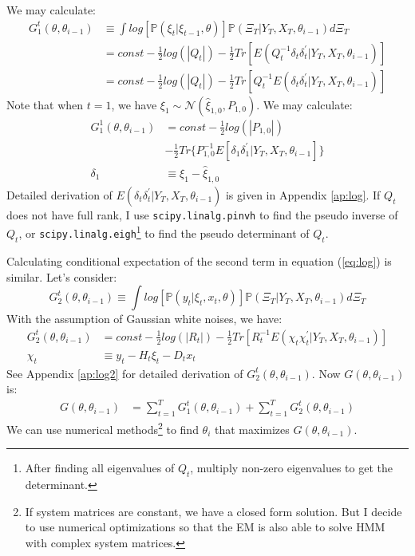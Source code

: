 \documentclass[12pt]{article}
\numberwithin{equation}{section}
\begin{document}
We may calculate:
\begin{align}
    G_1^{t}(\theta,\theta_{i-1}) &\equiv \int log[\mathbb{P}(\xi_t|\xi_{t-1},\theta)]\mathbb{P}(\Xi_T|Y_T,X_T,\theta_{i-1})d\Xi_T \nonumber \\
    &= const -\frac{1}{2}log(|Q_t|)-\frac{1}{2}Tr[E(Q_t^{-1}\delta_t\delta_t^{'}|Y_T,X_T,\theta_{i-1})] \nonumber \\
    &= const - \frac{1}{2}log(|Q_t|) - \frac{1}{2}Tr[Q_t^{-1}E(\delta_t\delta_t^{'}|Y_T,X_T,\theta_{i-1})] \label{eq:log1_trace}
\end{align}
Note that when $t=1$, we have $\xi_1\sim\mathcal{N}(\hat{\xi}_{1,0}, P_{1,0})$. We may calculate:
\begin{align}
    G_1^1(\theta,\theta_{i-1}) &= const - \frac{1}{2}log(|P_{1,0}|) \nonumber \\
    &- \frac{1}{2}Tr\{P_{1,0}^{-1}E[\delta_1\delta_1^{'}|Y_T, X_T, \theta_{i-1}]\} \nonumber \\
    \delta_1 &\equiv \xi_1 - \hat{\xi}_{1,0} \nonumber
\end{align}
Detailed derivation of $E(\delta_t\delta_t^{'}|Y_T,X_T,\theta_{i-1})$ is given in Appendix \ref{ap:log}. If $Q_t$ does not have full rank, I use \texttt{scipy.linalg.pinvh} to find the pseudo inverse of $Q_t$, or \texttt{scipy.linalg.eigh}\footnote{After finding all eigenvalues of $Q_t$, multiply non-zero eigenvalues to get the determinant.} to find the pseudo determinant of $Q_t$.

Calculating conditional expectation of the second term in equation (\ref{eq:log}) is similar. Let's consider:
\[
    G_2^t(\theta,\theta_{i-1}) \equiv \int log[\mathbb{P}(y_t|\xi_{t},x_t, \theta)]\mathbb{P}(\Xi_T|Y_T,X_T,\theta_{i-1})d\Xi_T 
\]
With the assumption of Gaussian white noises, we have:
\begin{align}
    G_2^t(\theta,\theta_{i-1}) &= const - \frac{1}{2}log(|R_t|)-\frac{1}{2}Tr[R_t^{-1}E(\chi_t\chi_t^{'}|Y_T,X_T,\theta_{i-1})] \label{eq:log2_trace} \\
    \chi_t &\equiv y_t - H_t\xi_t - D_tx_t \nonumber
\end{align}
See Appendix \ref{ap:log2} for detailed derivation of $G_2^t(\theta,\theta_{i-1})$. Now $G(\theta,\theta_{i-1})$ is:
\begin{align*}
    G(\theta,\theta_{i-1}) &= \sum_{t=1}^{T}G_1^t(\theta,\theta_{i-1}) + \sum_{t=1}^{T}G_2^t(\theta,\theta_{i-1})
\end{align*}
We can use numerical methods\footnote{If system matrices are constant, we have a closed form solution. But I decide to use numerical optimizations so that the EM is also able to solve HMM with complex system matrices.} to find $\theta_i$ that maximizes $G(\theta,\theta_{i-1})$.
\end{document}
